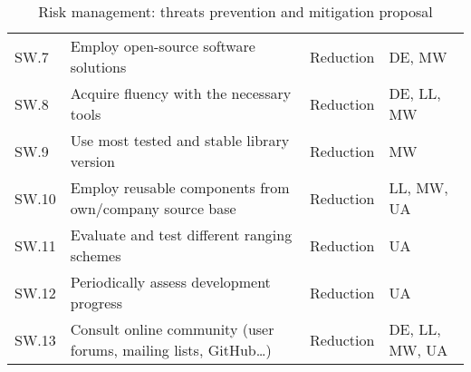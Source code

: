\begin{table}[H]
\begin{tabular}{@{} m{3em} >{\small}m{20em} m{5em} m{8em} @{}}
    SW.7  & Employ open-source software solutions & Reduction & DE, MW \\
    SW.8  & Acquire fluency with the necessary tools & Reduction & DE, LL, MW \\
    SW.9  & Use most tested and stable library version & Reduction & MW \\
    SW.10  & Employ reusable components from own/company source base & Reduction & LL, MW, UA \\
    SW.11 & Evaluate and test different ranging schemes & Reduction & UA \\
    SW.12 & Periodically assess development progress & Reduction & UA \\
    SW.13 & Consult online community (user forums, mailing lists, GitHub\dots) & Reduction & DE, LL, MW, UA \\
    \bottomrule
\end{tabular}
\caption{Risk management: threats prevention and mitigation proposal}\label{tab:risk_mgmt}
\end{table}
